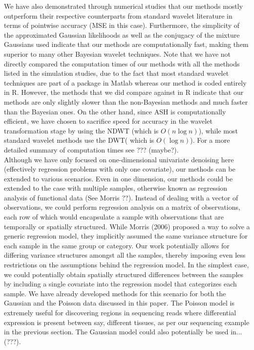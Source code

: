 \documentclass[12pt]{article}
\begin{document}
We have also demonstrated through numerical studies that our methods mostly outperform their respective counterparts from standard wavelet literature in terms of pointwise accuracy (MSE in this case). Furthermore, the simplicity of the approximated Gaussian likelihoods as well as the conjugacy of the mixture Gaussians used indicate that our methods are computationally fast, making them superior to many other Bayesian wavelet techniques. Note that we have not directly compared the computation times of our methods with all the methods listed in the simulation studies, due to the fact that most standard wavelet techniques are part of a package in Matlab whereas our method is coded entirely in R. However, the methods that we did compare against in R indicate that our methods are only slightly slower than the non-Bayesian methods and much faster than the Bayesian ones. On the other hand, since ASH is computationally efficient, we have chosen to sacrifice speed for accuracy in the wavelet transformation stage by using the NDWT (which is $O(n\log n)$), while most standard wavelet methods use the DWT( which is $O(\log n)$). For a more detailed summary of computation times see ??? (maybe?).\bigskip\\
Although we have only focused on one-dimensional univariate denoising here (effectively regression problems with only one covariate), our methods can be extended to various scenarios. Even in one dimension, our methods could be extended to the case with multiple samples, otherwise known as regression analysis of functional data (See Morris ??). Instead of dealing with a vector of observations, we could perform regression analysis on a matrix of observations, each row of which would encapsulate a sample with observations that are temporally or spatially structured. While Morris (2006) proposed a way to solve a generic regression model, they implicitly assumed the same variance structure for each sample in the same group or category. Our work potentially allows for differing variance structures amongst all the samples, thereby imposing even less restrictions on the assumptions behind the regression model. In the simplest case, we could potentially obtain spatially structured differences between the samples by including a single covariate into the regression model that categorizes each sample. We have already developed methods for this scenario for both the Gaussian and the Poisson data discussed in this paper. The Poisson model is extremely useful for discovering regions in sequencing reads where differential expression is present between say, different tissues, as per our sequencing example in the previous section. The Gaussian model could also potentially be used in...(???).\bigskip\\
\end{document}
